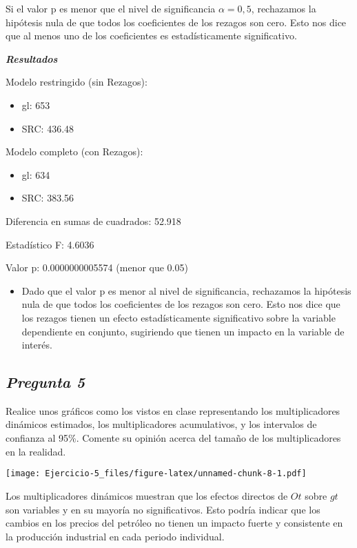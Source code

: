 \documentclass[
  12pt,
]{article}
\providecommand{\tightlist}{%
  \setlength{\itemsep}{0pt}\setlength{\parskip}{0pt}}
\begin{document}
Si el valor p es menor que el nivel de significancia \(\alpha=0,5\),
rechazamos la hipótesis nula de que todos los coeficientes de los
rezagos son cero. Esto nos dice que al menos uno de los coeficientes es
estadísticamente significativo.

\textbf{\emph{Resultados}}

Modelo restringido (sin Rezagos):

\begin{itemize}
\tightlist
\item
  gl: 653
\item
  SRC: 436.48
\end{itemize}

Modelo completo (con Rezagos):

\begin{itemize}
\tightlist
\item
  gl: 634
\item
  SRC: 383.56
\end{itemize}

Diferencia en sumas de cuadrados: 52.918

Estadístico F: 4.6036

Valor p: 0.0000000005574 (menor que 0.05)

\begin{itemize}
\tightlist
\item
  Dado que el valor p es menor al nivel de significancia, rechazamos la
  hipótesis nula de que todos los coeficientes de los rezagos son cero.
  Esto nos dice que los rezagos tienen un efecto estadísticamente
  significativo sobre la variable dependiente en conjunto, sugiriendo
  que tienen un impacto en la variable de interés.
\end{itemize}

\subsection{\texorpdfstring{\textbf{\emph{Pregunta
5}}}{Pregunta 5}}\label{pregunta-5}

Realice unos gráficos como los vistos en clase representando los
multiplicadores dinámicos estimados, los multiplicadores acumulativos, y
los intervalos de confianza al 95\%. Comente su opinión acerca del
tamaño de los multiplicadores en la realidad.

\texttt{[image: Ejercicio-5\_files/figure-latex/unnamed-chunk-8-1.pdf]}

Los multiplicadores dinámicos muestran que los efectos directos de
\(Ot\) sobre \(gt\) son variables y en su mayoría no significativos.
Esto podría indicar que los cambios en los precios del petróleo no
tienen un impacto fuerte y consistente en la producción industrial en
cada periodo individual.
\end{document}
